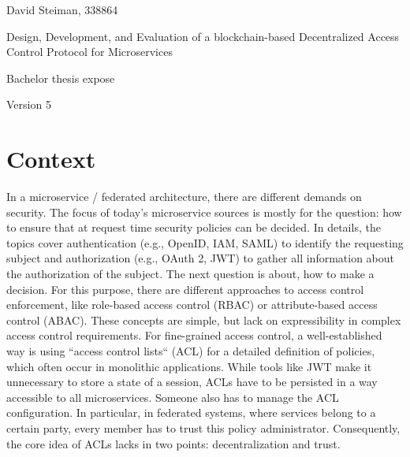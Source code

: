 \documentclass[12pt, conference]{IEEEtran}
\begin{document}
\pagestyle{empty}
\onecolumn

\clearscrheadings\clearscrplain
\begin{center}
David Steiman, 338864 \\

\vspace{8cm}

\begin{Huge}
Design, Development, and Evaluation of a blockchain-based Decentralized Access Control Protocol for Microservices \\
\end{Huge}
\begin{Large}
Bachelor thesis expose \\
\end{Large}
Version 5 \\


\end{center}
\clearpage

\twocolumn
\pagestyle{useheadings}


\section{Context}
In a microservice / federated architecture, there are different demands on security. The focus of today's microservice sources is mostly for the question: how to ensure that at request time security policies can be decided. In details, the topics cover authentication (e.g., OpenID, IAM, SAML) to identify the requesting subject and authorization (e.g., OAuth 2, JWT) to gather all information about the authorization of the subject. The next question is about, how to make a decision. For this purpose, there are different approaches to access control enforcement, like role-based access control (RBAC) or attribute-based access control (ABAC). These concepts are simple, but lack on expressibility in complex access control requirements.  For fine-grained access control, a well-established way is using ``access control lists`` (ACL) for a detailed definition of policies, which often occur in monolithic applications. While tools like JWT make it unnecessary to store a state of a session, ACLs have to be persisted in a way accessible to all microservices. Someone also has to manage the ACL configuration. In particular, in federated systems, where services belong to a certain party, every member has to trust this policy administrator.
Consequently, the core idea of ACLs lacks in two points: decentralization and trust.
\end{document}
